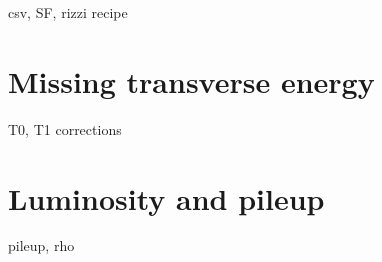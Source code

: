 csv, SF, rizzi recipe

\section{Missing transverse energy}

T0, T1 corrections

\section{Luminosity and pileup}

pileup, rho
